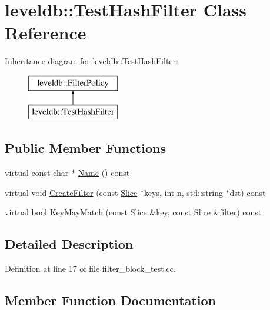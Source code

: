 \hypertarget{classleveldb_1_1_test_hash_filter}{}\section{leveldb\+:\+:Test\+Hash\+Filter Class Reference}
\label{classleveldb_1_1_test_hash_filter}
Inheritance diagram for leveldb\+:\+:Test\+Hash\+Filter\+:\begin{figure}[H]
\begin{center}
\leavevmode
\includegraphics[height=2.000000cm]{classleveldb_1_1_test_hash_filter}
\end{center}
\end{figure}
\subsection*{Public Member Functions}
\begin{DoxyCompactItemize}
\item 
virtual const char $\ast$ \hyperlink{classleveldb_1_1_test_hash_filter_a07700084322049647b7c788aa53d8269}{Name} () const 
\item 
virtual void \hyperlink{classleveldb_1_1_test_hash_filter_ad6d9fc5e8008a1a2bd3d22d21cef6645}{Create\+Filter} (const \hyperlink{classleveldb_1_1_slice}{Slice} $\ast$keys, int n, std\+::string $\ast$dst) const 
\item 
virtual bool \hyperlink{classleveldb_1_1_test_hash_filter_ace8fcf2f1ac682fb958ddd38c53efe08}{Key\+May\+Match} (const \hyperlink{classleveldb_1_1_slice}{Slice} \&key, const \hyperlink{classleveldb_1_1_slice}{Slice} \&filter) const 
\end{DoxyCompactItemize}


\subsection{Detailed Description}


Definition at line 17 of file filter\+\_\+block\+\_\+test.\+cc.



\subsection{Member Function Documentation}
\hypertarget{classleveldb_1_1_test_hash_filter_ad6d9fc5e8008a1a2bd3d22d21cef6645}{}
